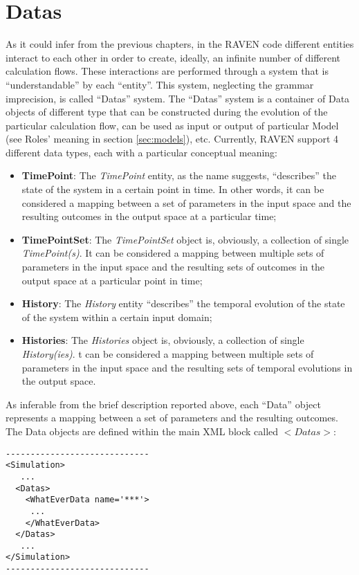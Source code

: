 \section{Datas  \\ \vspace{2 mm} {\small }}
\label{sec:Datas}
As it could infer from the previous chapters,  in the RAVEN code different entities interact to each other in order to create, ideally, an infinite number of different calculation flows. These interactions are performed through a system that is ``understandable'' by each ``entity''. This system, neglecting the grammar imprecision,  is called ``Datas'' system. The ``Datas'' system is a container of Data objects of different type that can be constructed during the evolution of the particular calculation flow, can be used as input or output of particular Model (see Roles' meaning in section \ref{sec:models}), etc. 
Currently, RAVEN support 4 different data types, each with a particular conceptual meaning:
\begin{itemize}
\item \textbf{TimePoint}: The \textit{TimePoint} entity, as the name suggests, ``describes'' the state of the system in a certain point in time. In other words, it can be considered a mapping between a set of parameters in the input space and the resulting outcomes in the output space at a particular time;
\item \textbf{TimePointSet}: The \textit{TimePointSet} object is, obviously, a collection of single \textit{TimePoint(s)}. It can be considered a mapping between multiple sets of parameters in the input space and the resulting sets of outcomes in the output space at a particular point in time;
\item \textbf{History}:  The \textit{History} entity ``describes'' the temporal evolution of the state of the system within a certain input domain;
\item \textbf{Histories}:  The \textit{Histories} object is, obviously, a collection of single \textit{History(ies)}. t can be considered a mapping between multiple sets of parameters in the input space and the resulting sets of temporal evolutions in the output space.
\end{itemize}
As inferable  from the brief description reported above, each ``Data'' object represents a mapping between a set of parameters and the resulting outcomes.
The Data objects are defined within the main XML block called $<Datas>$:
\begin{lstlisting}[style=XML]
-----------------------------
<Simulation>
   ...
  <Datas> 
    <WhatEverData name='***'>  
     ... 
    </WhatEverData> 
  </Datas>
   ...
</Simulation>
-----------------------------
\end{lstlisting}

